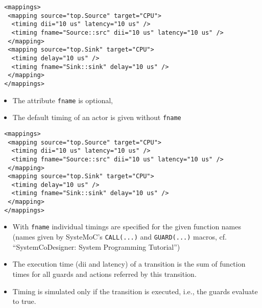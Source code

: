 \begin{frame}[fragile=singleslide]
\begin{lstlisting}
 <mappings>
  <mapping source="top.Source" target="CPU">
   <timing dii="10 us" latency="10 us" />
   <timing fname="Source::src" dii="10 us" latency="10 us" />
  </mapping>
  <mapping source="top.Sink" target="CPU">
   <timing delay="10 us" />
   <timing fname="Sink::sink" delay="10 us" />
  </mapping>
 </mappings>
\end{lstlisting}
\begin{itemize}
\item The attribute \lstinline!fname! is optional,
\item The default timing of an actor is given without \lstinline!fname!
\end{itemize}
\vfill
\end{frame}


\begin{frame}[fragile=singleslide]
\begin{lstlisting}
 <mappings>
  <mapping source="top.Source" target="CPU">
   <timing dii="10 us" latency="10 us" />
   <timing fname="Source::src" dii="10 us" latency="10 us" />
  </mapping>
  <mapping source="top.Sink" target="CPU">
   <timing delay="10 us" />
   <timing fname="Sink::sink" delay="10 us" />
  </mapping>
 </mappings>
\end{lstlisting}
\begin{itemize}
\item With \lstinline!fname! individual timings are specified for the given function names (names given by SysteMoC's \lstinline!CALL(...)! and \lstinline!GUARD(...)! macros, cf. ``SystemCoDesigner: System Programming Tutorial'')
\item The execution time (dii and latency) of a transition is the sum of function times for all guards and actions referred by this transition.
\item Timing is simulated only if the transition is executed, i.e., the guards evaluate to true.
\end{itemize}
\vfill
\end{frame}


